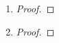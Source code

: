 \documentclass{article}
\begin{document}
\begin{enumerate}
        \item \begin{proof}
            
        \end{proof}

        \item \begin{proof}
            
        \end{proof}
    
    \end{enumerate}
\end{document}
